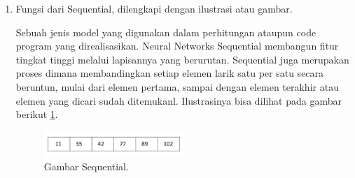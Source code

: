 \begin{enumerate}
\item Fungsi dari Sequential, dilengkapi dengan ilustrasi atau gambar.
\par Sebuah jenis model yang digunakan dalam perhitungan ataupun code program yang direalisasikan. Neural Networks Sequential membangun fitur tingkat tinggi melalui lapisannya yang berurutan. Sequential juga merupakan proses dimana membandingkan setiap elemen larik satu per satu secara beruntun, mulai dari elemen pertama, sampai dengan elemen terakhir atau elemen yang dicari sudah ditemukanl.  Ilustrasinya bisa dilihat pada gambar berikut  \ref{no8}.
	\begin{figure}[ht]
	\centerline{\includegraphics[width=0.5\textwidth]{figures/chapter6/no8.png}}
	\caption{Gambar Sequential.}
	\label{no8}
	\end{figure}
\end{enumerate}